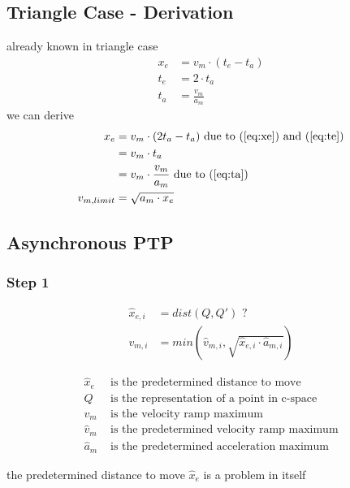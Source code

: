 \documentclass[%
  professionalfonts,%
  xcolor={%
    usenames,%
    dvipsnames,%
    svgnames,%
    table,%
    hyperref%
  }%
]{beamer}
\begin{document}
\subsection{Triangle Case - Derivation}
\begin{frame}
already known in triangle case
\begin{align}
x_{e} & = v_{m} \cdot (t_{e} - t_{a}) \label{eq:xe} \\
t_{e} & = 2 \cdot t_{a} \label{eq:te} \\
t_{a} & = \frac{v_{m}}{a_{m}} \label{eq:ta}
\end{align}
we can derive
\begin{align*}
x_{e} & = v_{m} \cdot (2 t_{a} - t_{a}) \text{ due to } (\ref{eq:xe}) \text{ and } (\ref{eq:te}) \\
& = v_{m} \cdot t_{a} \\
& = v_{m} \cdot \frac{v_{m}}{a_{m}}\text{ due to } (\ref{eq:ta}) \\
v_{m,limit} & = \sqrt{a_{m} \cdot x_{e}}
\end{align*}

\end{frame}

\subsection{Asynchronous PTP}

\subsubsection{Step 1}
\begin{frame}

\begin{align*}
\hat{x}_{e,i} & = dist(Q,Q') \text{ ?} \\
v_{m,i } & = min(\hat{v}_{m,i},\sqrt{\hat{x}_{e,i} \cdot \hat{a}_{m,i}})  \label{eq:asynvmi}
\end{align*}

\begin{align*}
\hat{x}_{e} & \text{ is the predetermined distance to move} \\
Q & \text{ is the representation of a point in c-space} \\
v_{m} & \text{ is the velocity ramp maximum} \\
\hat{v}_{m} & \text{ is the predetermined velocity ramp maximum} \\
\hat{a}_{m} & \text{ is the predetermined acceleration maximum} 
\end{align*}

the predetermined distance to move $\hat{x}_{e}$ is a problem in itself
\end{frame}
\end{document}
